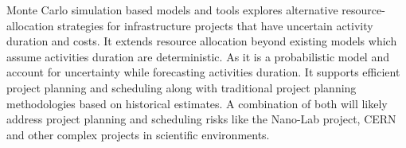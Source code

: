 Monte Carlo simulation based models and tools explores alternative resource-allocation strategies for infrastructure projects that have uncertain activity duration and costs. It extends resource allocation beyond existing models which assume activities duration are deterministic. As it is a probabilistic model and account for uncertainty while forecasting activities duration. It supports efficient project planning and scheduling along with traditional project planning methodologies based on historical estimates. A combination of both will likely address project planning and scheduling risks like the Nano-Lab project, CERN and other complex projects in scientific environments.
 
 

